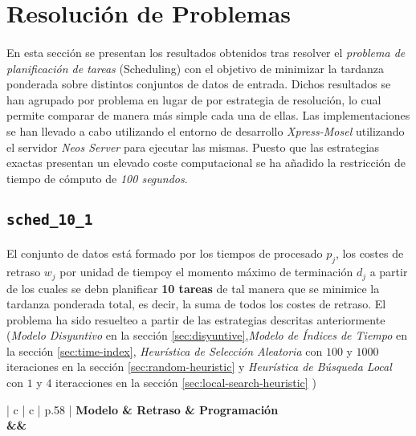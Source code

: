 \documentclass[spanish]{article}
\begin{document}
	\section{Resolución de Problemas}
	\label{sec:problems}

		\paragraph{}
		En esta sección se presentan los resultados obtenidos tras resolver el \emph{problema de planificación de tareas} (Scheduling) con el objetivo de minimizar la tardanza ponderada sobre distintos conjuntos de datos de entrada. Dichos resultados se han agrupado por problema en lugar de por estrategia de resolución, lo cual permite comparar de manera más simple cada una de ellas. Las implementaciones se han llevado a cabo utilizando el entorno de desarrollo \emph{Xpress-Mosel} \cite{tool:xpress-mosel} utilizando el servidor \emph{Neos Server} \cite{tool:neos-server} para ejecutar las mismas. Puesto que las estrategias exactas presentan un elevado coste computacional se ha añadido la restricción de tiempo de cómputo de \emph{100 segundos}.

		\subsection{\texttt{sched\_10\_1}}

			\paragraph{}
			El conjunto de datos está formado por los tiempos de procesado $p_j$, los costes de retraso $w_j$ por unidad de tiempoy el momento máximo de terminación $d_j$ a partir de los cuales se debn planificar \textbf{10 tareas} de tal manera que se minimice la tardanza ponderada total, es decir, la suma de todos los costes de retraso. El problema ha sido resuelteo a partir de las estrategias descritas anteriormente (\emph{Modelo Disyuntivo} en la sección \ref{sec:disyuntive},\emph{Modelo de Índices de Tiempo} en la sección \ref{sec:time-index}, \emph{Heurística de Selección Aleatoria} con $100$ y $1000$ iteraciones en la sección \ref{sec:random-heuristic} y \emph{Heurística de Búsqueda Local} con $1$ y $4$ iteracciones en la sección \ref{sec:local-search-heuristic} )

			\begin{table}
				\centering
				\begin{tabu}{ | c | c | p{.58\linewidth} |}
					\hline
					\bfseries Modelo & \bfseries Retraso & \bfseries Programación
					{\\\hline\model&\delay&\schedule}
					\\\hline
				\end{tabu}
				\caption{Resultados Obtenidos para el problema \texttt{sched\_10\_1}}
				\label{table:sol-sched_10_1}
			\end{table}
\end{document}
